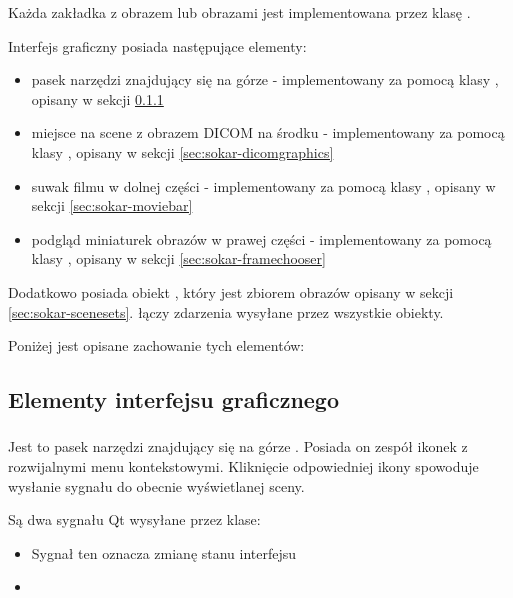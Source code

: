 
Każda zakładka z obrazem lub obrazami jest implementowana przez klasę .

Interfejs graficzny  posiada następujące elementy:
\begin{itemize}
    \item pasek narzędzi znajdujący się na górze - implementowany za pomocą klasy , opisany w sekcji \ref{sec:sokar-dicomtoolbar}
    \item miejsce na scene z obrazem DICOM na środku - implementowany za pomocą klasy , opisany w sekcji \ref{sec:sokar-dicomgraphics}
    \item suwak filmu w dolnej części - implementowany za pomocą klasy , opisany w sekcji \ref{sec:sokar-moviebar}
    \item podgląd miniaturek obrazów w prawej części - implementowany za pomocą klasy , opisany w sekcji \ref{sec:sokar-framechooser}
\end{itemize}

Dodatkowo posiada obiekt , który jest zbiorem obrazów opisany w sekcji \ref{sec:sokar-scenesets}.
 łączy zdarzenia wysyłane przez wszystkie obiekty.

Poniżej jest opisane zachowanie tych elementów:

\subsection{Elementy interfejsu graficznego}

\subsubsection{}
\label{sec:sokar-dicomtoolbar}

Jest to pasek narzędzi znajdujący się na górze .
Posiada on zespół ikonek z rozwijalnymi menu kontekstowymi.
Kliknięcie odpowiedniej ikony spowoduje wysłanie sygnału do obecnie wyświetlanej sceny.

Są dwa sygnału Qt wysyłane przez klase:
\begin{itemize}
    \item {}

    Sygnał ten oznacza zmianę stanu interfejsu

    \item {}
\end{itemize}


